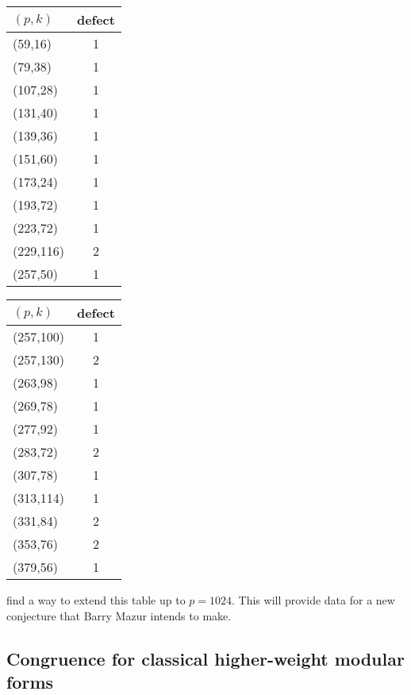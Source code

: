\documentclass{article}
\begin{document}
\begin{center}
\begin{tabular}{|l|c|}\hline
$(p,k)$&{\bf defect}\\\hline
(59,16)&1\\
(79,38)&1\\
(107,28)&1\\
(131,40)&1\\
(139,36)&1\\
(151,60)&1\\
(173,24)&1\\
(193,72)&1\\
(223,72)&1\\
(229,116)&2\\
(257,50)&1\\
\hline\end{tabular}
\begin{tabular}{|l|c|}\hline
$(p,k)$&{\bf defect}\\\hline
(257,100)&1\\
(257,130)&2\\
(263,98)&1\\
(269,78)&1\\
(277,92)&1\\
(283,72)&2\\
(307,78)&1\\
(313,114)&1\\
(331,84)&2\\
(353,76)&2\\
(379,56)&1\\
\hline\end{tabular}
\end{center}

\vspace{1em}
 find a way to extend this table up to $p=1024$.
This will provide data for a new conjecture that Barry Mazur intends to make.





\subsection{Congruence for classical higher-weight modular forms}

\end{document}
